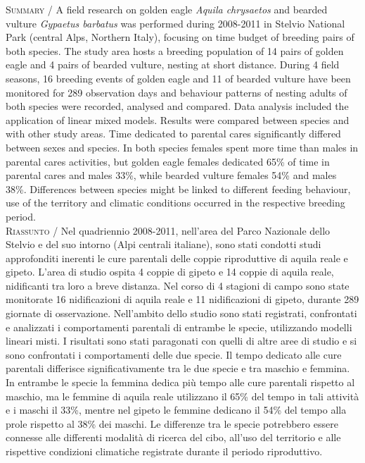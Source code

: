 {\small
\noindent \textsc{\color{MUSEBLUE} Summary} / A field research on golden eagle \textit{Aquila chrysaetos} and bearded
vulture \textit{Gypaetus barbatus}
was performed during 2008-2011 in Stelvio National Park (central Alps,
Northern Italy), focusing on time budget of breeding pairs of both
species. The study area hosts a breeding population of 14 pairs of
golden eagle and 4 pairs of bearded vulture, nesting at short distance.
During 4 field seasons, 16 breeding events of golden eagle and 11 of
bearded vulture have been monitored for 289 observation days and
behaviour patterns of nesting adults of both species were recorded,
analysed and compared. Data analysis included the application of linear
mixed models. Results were compared between species and with other
study areas. Time dedicated to parental cares significantly differed
between sexes and species. In both species females spent more time than
males in parental cares activities, but golden eagle females dedicated
65\% of time in parental cares and males 33\%, while bearded vulture
females 54\% and males 38\%. Differences between species might be
linked to different feeding behaviour, use of the territory and
climatic conditions occurred in the respective breeding period.  \\
\noindent \textsc{\color{MUSEBLUE} Riassunto} / Nel quadriennio 2008-2011, nell{\textquoteright}area del Parco Nazionale
dello Stelvio e del suo intorno (Alpi centrali italiane), sono stati
condotti studi approfonditi inerenti le cure parentali delle coppie
riproduttive di aquila reale e gipeto. L{\textquoteright}area di studio
ospita 4 coppie di gipeto e 14 coppie di aquila reale, nidificanti tra
loro a breve distanza. Nel corso di 4 stagioni di campo sono state
monitorate 16 nidificazioni di aquila reale e 11 nidificazioni di
gipeto, durante 289 giornate di osservazione.
Nell{\textquoteright}ambito dello studio sono stati registrati,
confrontati e analizzati i comportamenti parentali di entrambe le
specie, utilizzando modelli lineari misti. I risultati sono stati
paragonati con quelli di altre aree di studio e si sono confrontati i
comportamenti delle due specie. Il tempo dedicato alle cure parentali
differisce significativamente tra le due specie e tra maschio e
femmina. In entrambe le specie la femmina dedica pi\`u tempo alle cure
parentali rispetto al maschio, ma le femmine di aquila reale utilizzano
il 65\% del tempo in tali attivit\`a e i maschi il 33\%, mentre nel
gipeto le femmine dedicano il 54\% del tempo alla prole rispetto al
38\% dei maschi. Le differenze tra le specie potrebbero essere connesse
alle differenti modalit\`a di ricerca del cibo, all{\textquoteright}uso
del territorio e alle rispettive condizioni climatiche registrate
durante il periodo riproduttivo. \\
}
